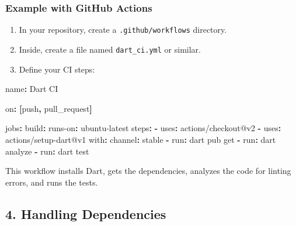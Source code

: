 \documentclass[
]{article}
\newenvironment{Shaded}{\begin{snugshade}}{\end{snugshade}}
\newcommand{\AttributeTok}[1]{\textcolor[rgb]{0.16,0.50,0.73}{#1}}
\newcommand{\FunctionTok}[1]{\textcolor[rgb]{0.56,0.27,0.68}{#1}}
\newcommand{\KeywordTok}[1]{\textcolor[rgb]{0.81,0.81,0.76}{\textbf{#1}}}
\newcommand{\StringTok}[1]{\textcolor[rgb]{0.96,0.31,0.31}{#1}}
\providecommand{\tightlist}{%
  \setlength{\itemsep}{0pt}\setlength{\parskip}{0pt}}
\begin{document}
\subsubsection{Example with GitHub
Actions}\label{example-with-github-actions}

\begin{enumerate}
\def\labelenumi{\arabic{enumi}.}
\tightlist
\item
  In your repository, create a \texttt{.github/workflows} directory.
\item
  Inside, create a file named \texttt{dart\_ci.yml} or similar.
\item
  Define your CI steps:
\end{enumerate}

\begin{Shaded}
\begin{Highlighting}[]
\FunctionTok{name}\KeywordTok{:}\AttributeTok{ Dart CI}

\FunctionTok{on}\KeywordTok{:}\AttributeTok{ }\KeywordTok{[}\AttributeTok{push}\KeywordTok{,}\AttributeTok{ pull\_request}\KeywordTok{]}

\FunctionTok{jobs}\KeywordTok{:}
\AttributeTok{  }\FunctionTok{build}\KeywordTok{:}
\AttributeTok{    }\FunctionTok{runs{-}on}\KeywordTok{:}\AttributeTok{ ubuntu{-}latest}
\AttributeTok{    }\FunctionTok{steps}\KeywordTok{:}
\AttributeTok{    }\KeywordTok{{-}}\AttributeTok{ }\FunctionTok{uses}\KeywordTok{:}\AttributeTok{ actions/checkout@v2}
\AttributeTok{    }\KeywordTok{{-}}\AttributeTok{ }\FunctionTok{uses}\KeywordTok{:}\AttributeTok{ actions/setup{-}dart@v1}
\AttributeTok{      }\FunctionTok{with}\KeywordTok{:}
\AttributeTok{        }\FunctionTok{channel}\KeywordTok{:}\AttributeTok{ }\StringTok{\textquotesingle{}stable\textquotesingle{}}
\AttributeTok{    }\KeywordTok{{-}}\AttributeTok{ }\FunctionTok{run}\KeywordTok{:}\AttributeTok{ dart pub get}
\AttributeTok{    }\KeywordTok{{-}}\AttributeTok{ }\FunctionTok{run}\KeywordTok{:}\AttributeTok{ dart analyze}
\AttributeTok{    }\KeywordTok{{-}}\AttributeTok{ }\FunctionTok{run}\KeywordTok{:}\AttributeTok{ dart test}
\end{Highlighting}
\end{Shaded}

This workflow installs Dart, gets the dependencies, analyzes the code
for linting errors, and runs the tests.

\subsection{4. Handling Dependencies}\label{handling-dependencies}
\end{document}
